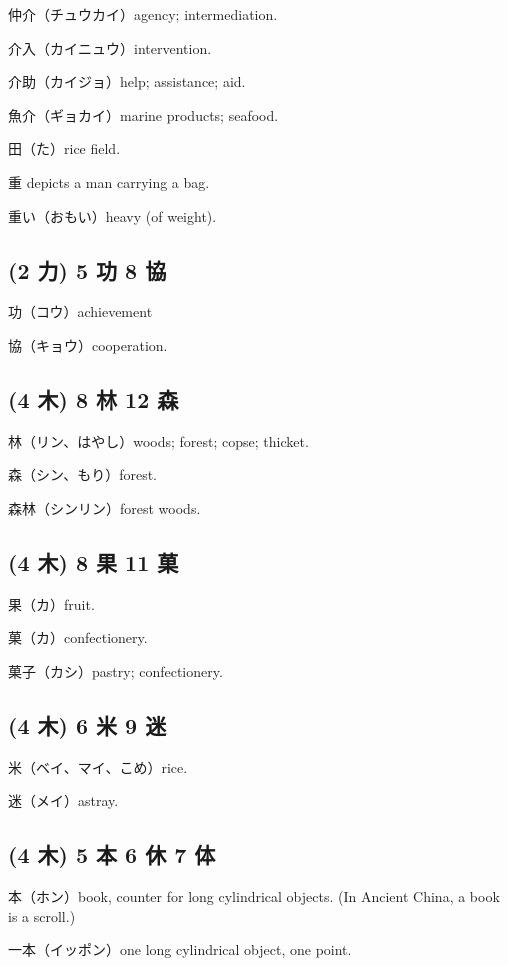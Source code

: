 仲介（チュウカイ）agency; intermediation.

介入（カイニュウ）intervention.

介助（カイジョ）help; assistance; aid.

魚介（ギョカイ）marine products; seafood.

田（た）rice field.

重 depicts a man carrying a bag.

重い（おもい）heavy (of weight).

\subsection{(2 力) 5 功 8 協}

功（コウ）achievement

協（キョウ）cooperation.

\subsection{(4 木) 8 林 12 森}

林（リン、はやし）woods; forest; copse; thicket.

森（シン、もり）forest.

森林（シンリン）forest woods.

\subsection{(4 木) 8 果 11 菓}

果（カ）fruit.

菓（カ）confectionery.

菓子（カシ）pastry; confectionery.

\subsection{(4 木) 6 米 9 迷}

米（ベイ、マイ、こめ）rice.

迷（メイ）astray.

\subsection{(4 木) 5 本 6 休 7 体}

本（ホン）book, counter for long cylindrical objects.
(In Ancient China, a book is a scroll.)

一本（イッポン）one long cylindrical object, one point.

